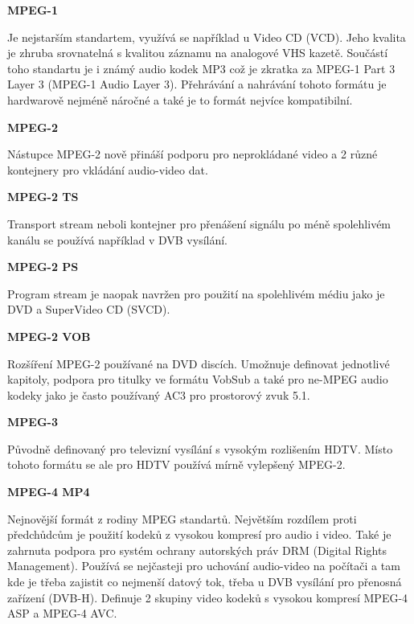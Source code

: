 \textbf{MPEG-1}

Je nejstarším standartem, využívá se například u Video CD (VCD). Jeho kvalita je zhruba srovnatelná s kvalitou záznamu na analogové VHS kazetě. Součástí toho standartu je i známý audio kodek MP3 což je zkratka za MPEG-1 Part 3 Layer 3 (MPEG-1 Audio Layer 3). Přehrávání a nahrávání tohoto formátu je hardwarově nejméně náročné a také je to formát nejvíce kompatibilní.

\vspace{10pt}

\textbf{MPEG-2}

Nástupce MPEG-2 nově přináší podporu pro neprokládané video a 2 různé kontejnery pro vkládání audio-video dat.

\vspace{10pt}

\textbf{MPEG-2 TS}

Transport stream neboli kontejner pro přenášení signálu po méně spolehlivém kanálu se používá například v DVB vysílání. 

\vspace{10pt}

\textbf{MPEG-2 PS}

Program stream je naopak navržen pro použití na spolehlivém médiu jako je DVD a SuperVideo CD (SVCD).

\vspace{10pt}

\textbf{MPEG-2 VOB}

Rozšíření MPEG-2 používané na DVD discích. Umožnuje definovat jednotlivé kapitoly, podpora pro titulky ve formátu VobSub a také pro ne-MPEG audio kodeky jako je často používaný AC3 pro prostorový zvuk 5.1.

\vspace{10pt}

\textbf{MPEG-3}

Původně definovaný pro televizní vysílání s vysokým rozlišením HDTV. Místo tohoto formátu se ale pro HDTV používá mírně vylepšený MPEG-2.

\vspace{10pt}

\textbf{MPEG-4 MP4}

Nejnovější formát z rodiny MPEG standartů. Největším rozdílem proti předchůdcům je použití kodeků z vysokou kompresí pro audio i video. Také je zahrnuta podpora pro systém ochrany autorských práv DRM (Digital Rights Management). Používá se nejčasteji pro uchování audio-video na počítači a tam kde je třeba zajistit co nejmenší datový tok, třeba u DVB vysílání pro přenosná zařízení (DVB-H). Definuje 2 skupiny video kodeků s vysokou kompresí MPEG-4 ASP a MPEG-4 AVC.


